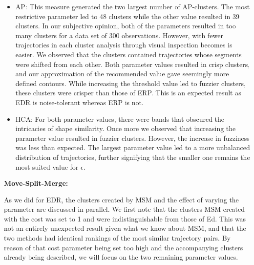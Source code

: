 
\begin{itemize}
\item AP: This measure generated the two largest number of AP-clusters. 
The most restrictive parameter led to 48 clusters while the other value resulted in 39 clusters. 
In our subjective opinion, both of the parameters resulted in too many clusters for a data set of 300 observations. 
However, with fewer trajectories in each cluster analysis through visual inspection becomes is easier.
We observed that the clusters contained trajectories whose segments were shifted from each other. 
Both parameter values resulted in crisp clusters, and our approximation of the recommended value gave seemingly more defined contours. 
While increasing the threshold value led to fuzzier clusters, these clusters were crisper than those of ERP. 
This is an expected result as EDR is noise-tolerant whereas ERP is not.
\medskip  
\item HCA: For both parameter values, there were bands that obscured the intricacies of shape similarity.
Once more we observed that increasing the parameter value resulted in fuzzier clusters. 
However, the increase in fuzziness was less than expected. 
The largest parameter value led to a more unbalanced distribution of trajectories, further signifying that the smaller one remains the most suited value for $\epsilon$.
\end{itemize}


\textbf{Move-Split-Merge:}

As we did for EDR, the clusters created by MSM and the effect of varying the parameter are discussed in parallel. 
We first note that the clusters MSM created with the cost was set to 1 and were indistinguishable from those of Ed. 
This was not an entirely unexpected result given what we know about MSM, and that the two methods had identical rankings of the most similar trajectory pairs. 
By reason of that cost parameter being set too high and the accompanying clusters already being described, we will focus on the two remaining parameter values. 


